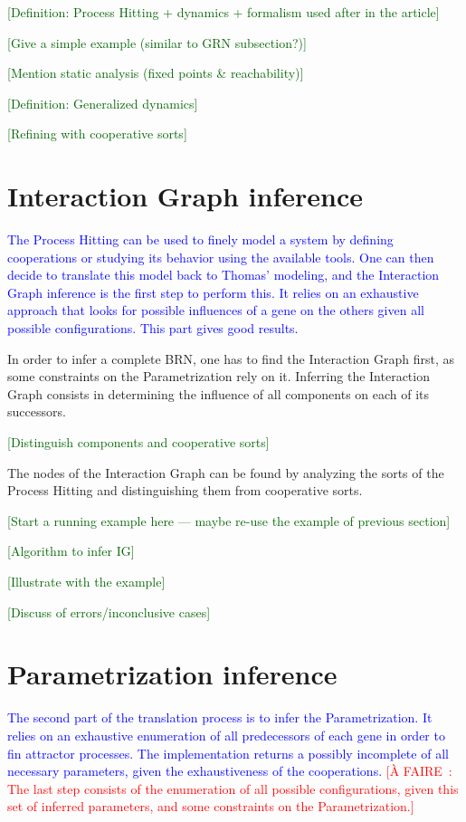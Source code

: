 \documentclass{llncs}
\newcommand{\afaire}[1]{\textcolor{red}{[À FAIRE~: #1]}}
\newcommand{\resume}[1]{\textcolor{blue}{#1}}
\newcommand{\todo}[1]{\textcolor{darkgreen}{[#1]}}
\begin{document}
\todo{Definition: Process Hitting + dynamics + formalism used after in the article}

\todo{Give a simple example (similar to GRN subsection?)}

\todo{Mention static analysis (fixed points \& reachability)}

\todo{Definition: Generalized dynamics}

\todo{Refining with cooperative sorts}



\section{Interaction Graph inference}
\resume{The Process Hitting can be used to finely model a system by defining cooperations or studying its behavior using the available tools. One can then decide to translate this model back to Thomas' modeling, and the Interaction Graph inference is the first step to perform this. It relies on an exhaustive approach that looks for possible influences of a gene on the others given all possible configurations. This part gives good results.}

In order to infer a complete BRN, one has to find the Interaction Graph first, as some constraints on the Parametrization rely on it. Inferring the Interaction Graph consists in determining the influence of all components on each of its successors.

\todo{Distinguish components and cooperative sorts}

The nodes of the Interaction Graph can be found by analyzing the sorts of the Process Hitting and distinguishing them from cooperative sorts.

\todo{Start a running example here --- maybe re-use the example of previous section}

\todo{Algorithm to infer IG}

\todo{Illustrate with the example}

\todo{Discuss of errors/inconclusive cases}



\section{Parametrization inference}
\resume{The second part of the translation process is to infer the Parametrization. It relies on an exhaustive enumeration of all predecessors of each gene in order to fin attractor processes. The implementation returns a possibly incomplete of all necessary parameters, given the exhaustiveness of the cooperations.} \afaire{The last step consists of the enumeration of all possible configurations, given this set of inferred parameters, and some constraints on the Parametrization.}
\end{document}
